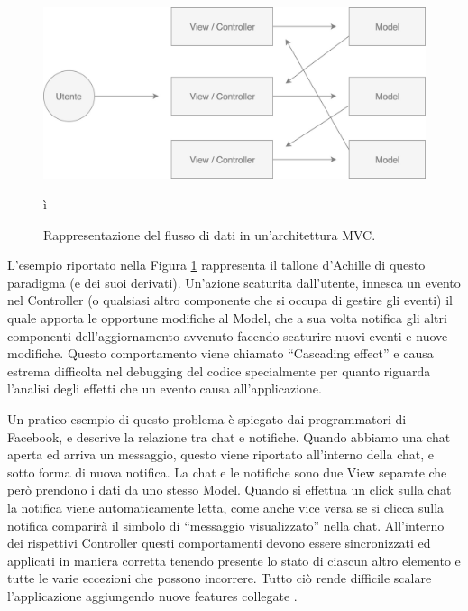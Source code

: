 \begin{figure}[h]
\centering
\includegraphics[width=12cm]{./images/MVCDataFlow}
\caption{Rappresentazione del flusso di dati in un'architettura MVC.}
\label{MVCDataFlow}ì
\end{figure}

L'esempio riportato nella Figura \ref{MVCDataFlow} rappresenta il tallone d'Achille di questo paradigma (e dei suoi derivati). Un'azione scaturita dall'utente, innesca un evento nel Controller (o qualsiasi altro componente che si occupa di gestire gli eventi) il quale apporta le opportune modifiche al Model, che a sua volta notifica gli altri componenti dell'aggiornamento avvenuto facendo scaturire nuovi eventi e nuove modifiche. Questo comportamento viene chiamato “Cascading effect” e causa estrema difficolta nel debugging del codice specialmente per quanto riguarda l'analisi degli effetti che un evento causa all'applicazione.

Un pratico esempio di questo problema è spiegato dai programmatori di Facebook, e descrive la relazione tra chat e notifiche. Quando abbiamo una chat aperta ed arriva un messaggio, questo viene riportato all'interno della chat, e sotto forma di nuova notifica. La chat e le notifiche sono due View separate che però prendono i dati da uno stesso Model. Quando si effettua un click sulla chat la notifica viene automaticamente letta, come anche vice versa se si clicca sulla notifica comparirà il simbolo di “messaggio visualizzato” nella chat.
All'interno dei rispettivi Controller questi comportamenti devono essere sincronizzati ed applicati in maniera corretta tenendo presente lo stato di ciascun altro elemento e tutte le varie eccezioni che possono incorrere. Tutto ciò rende difficile scalare l'applicazione aggiungendo nuove features collegate \cite{JingChenOnMVCAndFlux}.